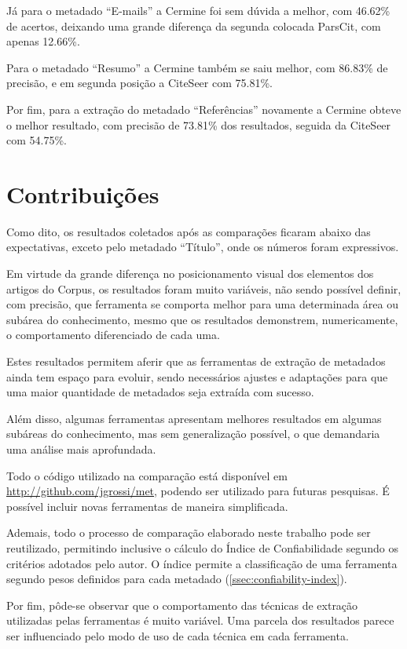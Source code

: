Já para o metadado ``E-mails'' a Cermine foi sem dúvida a melhor, com 46.62\% de acertos, deixando uma grande diferença da segunda colocada ParsCit, com apenas 12.66\%.

Para o metadado ``Resumo'' a Cermine também se saiu melhor, com 86.83\% de precisão, e em segunda posição a CiteSeer com 75.81\%.

Por fim, para a extração do metadado ``Referências'' novamente a Cermine obteve o melhor resultado, com precisão de 73.81\% dos resultados, seguida da CiteSeer com 54.75\%.

\section{Contribuições}
\label{sec:contributions}

Como dito, os resultados coletados após as comparações ficaram abaixo das expectativas, exceto pelo metadado ``Título'', onde os números foram expressivos.

Em virtude da grande diferença no posicionamento visual dos elementos dos artigos do Corpus, os resultados foram muito variáveis, não sendo possível definir, com precisão, que ferramenta se comporta melhor para uma determinada área ou subárea do conhecimento, mesmo que os resultados demonstrem, numericamente, o comportamento diferenciado de cada uma.

Estes resultados permitem aferir que as ferramentas de extração de metadados ainda tem espaço para evoluir, sendo necessários ajustes e adaptações para que uma maior quantidade de metadados seja extraída com sucesso. 

Além disso, algumas ferramentas apresentam melhores resultados em algumas subáreas do conhecimento, mas sem generalização possível, o que demandaria uma análise mais aprofundada.

Todo o código utilizado na comparação está disponível em \url{http://github.com/jgrossi/met}, podendo ser utilizado para futuras pesquisas. É possível incluir novas ferramentas de maneira simplificada.

Ademais, todo o processo de comparação elaborado neste trabalho pode ser reutilizado, permitindo inclusive o cálculo do Índice de Confiabilidade segundo os critérios adotados pelo autor. O índice permite a classificação de uma ferramenta segundo pesos definidos para cada metadado (\autoref{ssec:confiability-index}).

Por fim, pôde-se observar que o comportamento das técnicas de extração utilizadas pelas ferramentas é muito variável. Uma parcela dos resultados parece ser influenciado pelo modo de uso de cada técnica em cada ferramenta.


